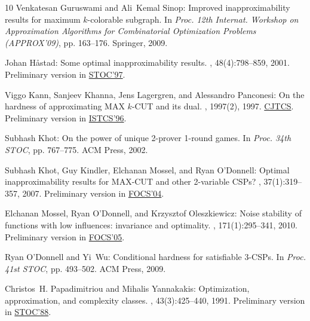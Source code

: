 \begin{thebibliography}{10}
{\sc Venkatesan Guruswami and Ali~Kemal Sinop}: Improved inapproximability
  results for maximum $k$-colorable subgraph.
\newblock In {\em Proc. 12th Internat. Workshop on Approximation Algorithms for
  Combinatorial Optimization Problems (APPROX'09)}, pp. 163--176. Springer,
  2009.
\newblock [\epfmtdoi{10.1007/978-3-642-03685-9\_13}]

{\sc Johan H{\aa}stad}: Some optimal inapproximability results.
, 48(4):798--859, 2001.
\newblock Preliminary version in
  \href{http://dx.doi.org/10.1145/258533.258536}{STOC'97}.
\newblock [\epfmtdoi{10.1145/502090.502098}]

{\sc Viggo Kann, Sanjeev Khanna, Jens Lagergren, and Alessandro Panconesi}: On
  the hardness of approximating {MAX} $k$-{CUT} and its dual.
, 1997(2), 1997.
\newblock
  \href{http://cjtcs.cs.uchicago.edu/articles/1997/2/contents.html}{CJTCS}.
  Preliminary version in
  \href{http://www.cis.upenn.edu/~sanjeev/papers/maxcut.ps}{ISTCS'96}.

{\sc Subhash Khot}: On the power of unique 2-prover 1-round games.
\newblock In {\em Proc. 34th STOC}, pp. 767--775. ACM Press, 2002.
\newblock [\epfmtdoi{10.1145/509907.510017}]

{\sc Subhash Khot, Guy Kindler, Elchanan Mossel, and Ryan O'Donnell}: Optimal
  inapproximability results for {MAX-CUT} and other 2-variable {CSPs}?
, 37(1):319--357, 2007.
\newblock Preliminary version in
  \href{http://dx.doi.org/10.1109/FOCS.2004.49}{FOCS'04}.
\newblock [\epfmtdoi{10.1137/S0097539705447372}]

{\sc Elchanan Mossel, Ryan O'Donnell, and Krzysztof Oleszkiewicz}: Noise
  stability of functions with low influences: invariance and optimality.
, 171(1):295--341, 2010.
\newblock Preliminary version in
  \href{http://dx.doi.org/10.1109/SFCS.2005.53}{FOCS'05}.

{\sc Ryan O'Donnell and Yi~Wu}: Conditional hardness for satisfiable 3-{CSP}s.
\newblock In {\em Proc. 41st STOC}, pp. 493--502. ACM Press, 2009.
\newblock [\epfmtdoi{10.1145/1536414.1536482}]

{\sc Christos~H. Papadimitriou and Mihalis Yannakakis}: Optimization,
  approximation, and complexity classes.
, 43(3):425--440, 1991.
\newblock Preliminary version in
  \href{http://dx.doi.org/10.1145/62212.62233}{STOC'88}.
\newblock [\epfmtdoi{10.1016/0022-0000(91)90023-X}]


\end{thebibliography}
